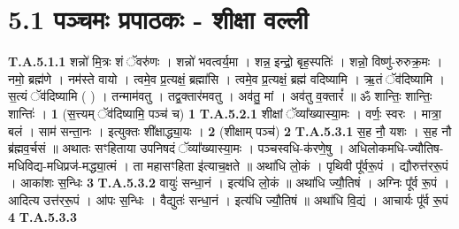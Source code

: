 \documentclass[17pt]{extarticle}
\begin{document}
\section*{ 5.1     पञ्चमः प्रपाठकः - शीक्षा वल्ली }
                                \textbf{ T.A.5.1.1} \newline
                  शन्नो॑ मि॒त्रः शं ॅवरु॑णः । शन्नो॑ भवत्वर्य॒मा । शन्न॒ इन्द्रो॒ बृह॒स्पतिः॑ । शन्नो॒ विष्णु॑-रुरुक्र॒मः । नमो॒ ब्रह्म॑णे । नम॑स्ते वायो । त्वमे॒व प्र॒त्यक्षं॒ ब्रह्मा॑सि । त्वमे॒व प्र॒त्यक्षं॒ ब्रह्म॑ वदिष्यामि । ऋ॒तं ॅव॑दिष्यामि । स॒त्यं ॅव॑दिष्यामि ( ) । तन्माम॑वतु । तद्व॒क्तार॑मवतु । अव॑तु॒ मां । अव॑तु व॒क्तारं᳚ ॥ ॐ शान्तिः॒ शान्तिः॒ शान्तिः॑ । \textbf{ 1} \newline
                  \newline
                                                        (स॒त्त्यम् ॅव॑दिष्यामि॒ पञ्च॑ च) \textbf{1} \newline \newline
                                \textbf{ T.A.5.2.1} \newline
                  शीक्षां ॅव्या᳚ख्यास्या॒मः । वर्णः॒ स्वरः । मात्रा॒ बलं । साम॑ सन्ता॒नः । इत्युक्तः शी᳚क्षाद्ध्या॒यः । \textbf{ 2} \newline
                  \newline
                                                        (शीक्षाम् पञ्च॑) \textbf{2} \newline \newline
                                \textbf{ T.A.5.3.1} \newline
                  स॒ह नौ॒ यशः । स॒ह नौ ब्र॑ह्मव॒र्चसं ॥  अथातः सꣳहिताया उपनिषदं ॅव्या᳚ख्यास्या॒मः । पञ्चस्वधि-क॑रणे॒षु । अधिलोकमधि-ज्यौतिष-मधिविद्य-मधिप्रज॑-मद्ध्या॒त्मं । ता महासꣳहिता इ॑त्याच॒क्षते ॥ अथा॑धि लो॒कं । पृथिवी पू᳚र्वरू॒पं । द्यौरुत्त॑ररू॒पं । आका॑शः स॒न्धिः \textbf{ 3} \newline
                  \newline
                                                                  \textbf{ T.A.5.3.2} \newline
                  वायुः॑ सन्धा॒नं । इत्य॑धि लो॒कं ॥  अथा॑धि ज्यौ॒तिषं । अग्निः पू᳚र्व रू॒पं । आदित्य उत्त॑ररू॒पं । आ॑पः स॒न्धिः । वैद्युतः॑ सन्धा॒नं । इत्य॑धि ज्यौ॒तिषं ॥ अथा॑धि वि॒द्यं । आचार्यः पू᳚र्व रू॒पं \textbf{ 4} \newline
                  \newline
                                                                  \textbf{ T.A.5.3.3} \newline
\end{document}
